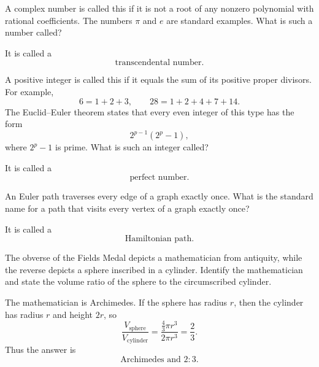     \begin{expectedproblem}
        A complex number is called this if it is not a root of any nonzero
        polynomial with rational coefficients. The numbers $\pi$ and $e$ are
        standard examples. What is such a number called?
    \end{expectedproblem}

    \begin{solution}
        It is called a
        \[
            \boxed{\text{transcendental number}}.
        \]
    \end{solution}

    \begin{expectedproblem}
        A positive integer is called this if it equals the sum of its positive
        proper divisors. For example,
        \[
            6=1+2+3,
            \qquad
            28=1+2+4+7+14.
        \]
        The Euclid--Euler theorem states that every even integer of this type
        has the form
        \[
            2^{p-1}(2^p-1),
        \]
        where $2^p-1$ is prime. What is such an integer called?
    \end{expectedproblem}

    \begin{solution}
        It is called a
        \[
            \boxed{\text{perfect number}}.
        \]
    \end{solution}

    \begin{expectedproblem}
        An Euler path traverses every edge of a graph exactly once. What is the
        standard name for a path that visits every vertex of a graph exactly
        once?
    \end{expectedproblem}

    \begin{solution}
        It is called a
        \[
            \boxed{\text{Hamiltonian path}}.
        \]
    \end{solution}

    \begin{expectedproblem}
        The obverse of the Fields Medal depicts a mathematician from antiquity,
        while the reverse depicts a sphere inscribed in a cylinder. Identify the
        mathematician and state the volume ratio of the sphere to the
        circumscribed cylinder.
    \end{expectedproblem}

    \begin{solution}
        The mathematician is Archimedes. If the sphere has radius $r$, then the
        cylinder has radius $r$ and height $2r$, so
        \[
            \frac{V_{\mathrm{sphere}}}{V_{\mathrm{cylinder}}}
            =
            \frac{\frac43\pi r^3}{2\pi r^3}
            =
            \frac23.
        \]
        Thus the answer is
        \[
            \boxed{\text{Archimedes and }2:3}.
        \]
    \end{solution}

